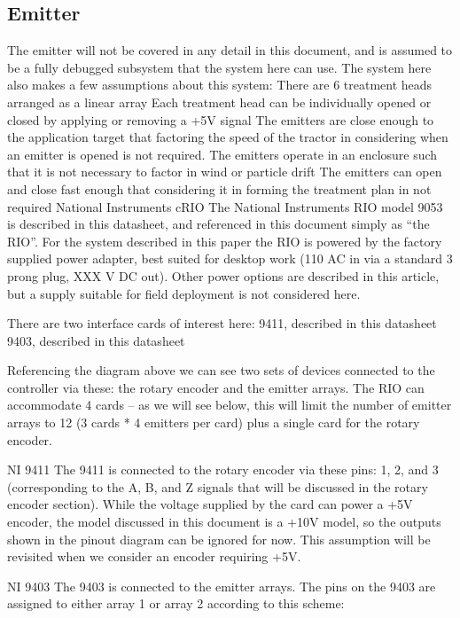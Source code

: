 \documentclass[letterpaper]{article}
\begin{document}
\subsection{Emitter}
The emitter will not be covered in any detail in this document, and is assumed to be a fully debugged subsystem that the system here can use.  The system here also makes a few assumptions about this system:
There are 6 treatment heads arranged as a linear array
Each treatment head can be individually opened or closed by applying or removing a +5V signal
The emitters are close enough to the application target that factoring the speed of the tractor in considering when an emitter is opened is not required.
The emitters operate in an enclosure such that it is not necessary to factor in wind or particle drift
The emitters can open and close fast enough that considering it in forming the treatment plan in not required
National Instruments cRIO
The National Instruments RIO model 9053 is described in this datasheet, and referenced in this document simply as “the RIO”. For the system described in this paper the RIO is powered by the factory supplied power adapter, best suited for desktop work (110 AC in via a standard 3 prong plug, XXX V DC out). Other power options are described in this article, but a supply suitable for field deployment is not considered here.
 
There are two interface cards of interest here:
9411, described in this datasheet
9403, described in this datasheet

Referencing the diagram above we can see two sets of devices connected to the controller via these: the rotary encoder and the emitter arrays. The RIO can accommodate 4 cards -- as we will see below, this will limit the number of emitter arrays to 12 (3 cards * 4 emitters per card) plus a single card for the rotary encoder.

NI 9411
The 9411 is connected to the rotary encoder via these pins: 1, 2, and 3 (corresponding to the A, B, and Z signals that will be discussed in the rotary encoder section).  While the voltage supplied by the card can power a +5V encoder, the model discussed in this document is a +10V model, so the outputs shown in the pinout diagram can be ignored for now. This assumption will be revisited when we consider an encoder requiring +5V.



NI 9403
The 9403 is connected to the emitter arrays. The pins on the 9403 are assigned to either array 1 or array 2 according to this scheme:
\end{document}
